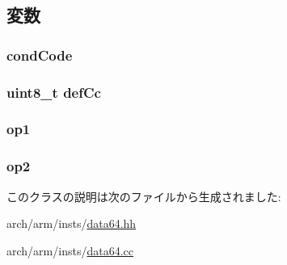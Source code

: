 \subsection{変数}
\hypertarget{classArmISA_1_1DataXCondCompRegOp_a273dc0fe84de8f4a9cf52aaf8dc27885}{
\subsubsection[{condCode}]{ {\bf condCode}}}
\label{classArmISA_1_1DataXCondCompRegOp_a273dc0fe84de8f4a9cf52aaf8dc27885}
\hypertarget{classArmISA_1_1DataXCondCompRegOp_a67b4730d4f641c62c31e1b7724f93433}{
\subsubsection[{defCc}]{\setlength{\rightskip}{0pt plus 5cm}uint8\_\-t {\bf defCc}}}
\label{classArmISA_1_1DataXCondCompRegOp_a67b4730d4f641c62c31e1b7724f93433}
\hypertarget{classArmISA_1_1DataXCondCompRegOp_a4c465c43ad568f8bcf8ae71480e9cfea}{
\subsubsection[{op1}]{ {\bf op1}}}
\label{classArmISA_1_1DataXCondCompRegOp_a4c465c43ad568f8bcf8ae71480e9cfea}
\hypertarget{classArmISA_1_1DataXCondCompRegOp_a7799ff6cbe5a252199059eb8665820e7}{
\subsubsection[{op2}]{ {\bf op2}}}
\label{classArmISA_1_1DataXCondCompRegOp_a7799ff6cbe5a252199059eb8665820e7}


このクラスの説明は次のファイルから生成されました:\begin{DoxyCompactItemize}
\item 
arch/arm/insts/\hyperlink{data64_8hh}{data64.hh}\item 
arch/arm/insts/\hyperlink{data64_8cc}{data64.cc}\end{DoxyCompactItemize}
